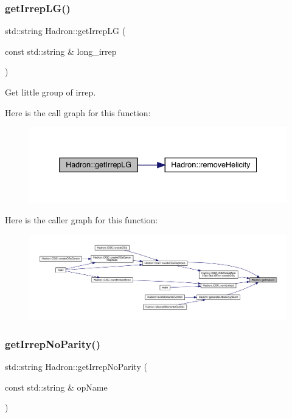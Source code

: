 \subsubsection{\texorpdfstring{getIrrepLG()}{getIrrepLG()}}
{\footnotesize\ttfamily std\+::string Hadron\+::get\+Irrep\+LG (\begin{DoxyParamCaption}\item[{const std\+::string \&}]{long\+\_\+irrep }\end{DoxyParamCaption})}



Get little group of irrep. 

Here is the call graph for this function\+:\nopagebreak
\begin{figure}[H]
\begin{center}
\leavevmode
\includegraphics[width=338pt]{d1/daf/namespaceHadron_a79373fb0ae210931217ae33dc98f5ee9_cgraph}
\end{center}
\end{figure}
Here is the caller graph for this function\+:\nopagebreak
\begin{figure}[H]
\begin{center}
\leavevmode
\includegraphics[width=350pt]{d1/daf/namespaceHadron_a79373fb0ae210931217ae33dc98f5ee9_icgraph}
\end{center}
\end{figure}
\mbox{\label{namespaceHadron_ae2543483bce4c1e4b6c9ca56d01fe9ac}} 
\subsubsection{\texorpdfstring{getIrrepNoParity()}{getIrrepNoParity()}}
{\footnotesize\ttfamily std\+::string Hadron\+::get\+Irrep\+No\+Parity (\begin{DoxyParamCaption}\item[{const std\+::string \&}]{op\+Name }\end{DoxyParamCaption})}

